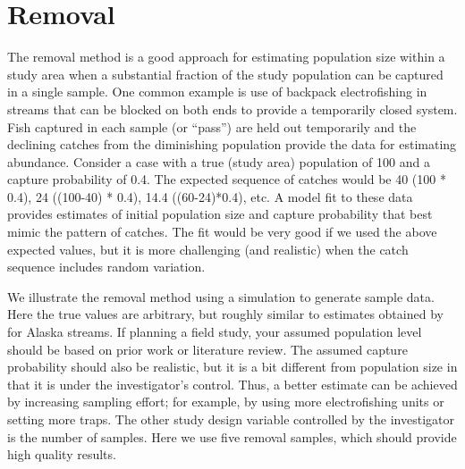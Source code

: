 \documentclass[
]{krantz}
\begin{document}
\hypertarget{Removal}{%
\section{Removal}\label{Removal}}

The removal method is a good approach for estimating population size within a study area when a substantial fraction of the study population can be captured in a single sample. One common example is use of backpack electrofishing in streams that can be blocked on both ends to provide a temporarily closed system. Fish captured in each sample (or ``pass'') are held out temporarily and the declining catches from the diminishing population provide the data for estimating abundance. Consider a case with a true (study area) population of 100 and a capture probability of 0.4. The expected sequence of catches would be 40 (100 * 0.4), 24 ((100-40) * 0.4), 14.4 ((60-24)*0.4), etc. A model fit to these data provides estimates of initial population size and capture probability that best mimic the pattern of catches. The fit would be very good if we used the above expected values, but it is more challenging (and realistic) when the catch sequence includes random variation.

We illustrate the removal method using a simulation to generate sample data. Here the true values are arbitrary, but roughly similar to estimates obtained by \citet{bryant_2000} for Alaska streams. If planning a field study, your assumed population level should be based on prior work or literature review. The assumed capture probability should also be realistic, but it is a bit different from population size in that it is under the investigator's control. Thus, a better estimate can be achieved by increasing sampling effort; for example, by using more electrofishing units or setting more traps. The other study design variable controlled by the investigator is the number of samples. Here we use five removal samples, which should provide high quality results.
\end{document}
